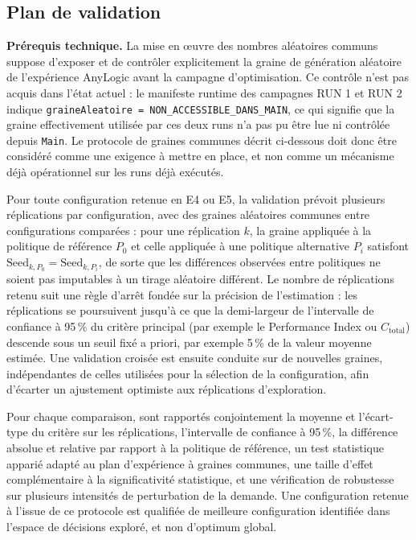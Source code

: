 \documentclass[11pt,a4paper]{article}
\newcommand{\code}[1]{\texttt{#1}}
\begin{document}
\subsection{Plan de validation}

\textbf{Prérequis technique.} La mise en \oe uvre des nombres aléatoires communs suppose d'exposer et de contrôler explicitement la graine de génération aléatoire de l'expérience AnyLogic avant la campagne d'optimisation. Ce contrôle n'est pas acquis dans l'état actuel : le manifeste runtime des campagnes RUN 1 et RUN 2 indique \code{graineAleatoire = NON\_ACCESSIBLE\_DANS\_MAIN}, ce qui signifie que la graine effectivement utilisée par ces deux runs n'a pas pu être lue ni contrôlée depuis \code{Main}. Le protocole de graines communes décrit ci-dessous doit donc être considéré comme une exigence à mettre en place, et non comme un mécanisme déjà opérationnel sur les runs déjà exécutés.

Pour toute configuration retenue en E4 ou E5, la validation prévoit plusieurs réplications par configuration, avec des graines aléatoires communes entre configurations comparées : pour une réplication \(k\), la graine appliquée à la politique de référence \(P_0\) et celle appliquée à une politique alternative \(P_i\) satisfont \(\text{Seed}_{k,P_0} = \text{Seed}_{k,P_i}\), de sorte que les différences observées entre politiques ne soient pas imputables à un tirage aléatoire différent. Le nombre de réplications retenu suit une règle d'arrêt fondée sur la précision de l'estimation : les réplications se poursuivent jusqu'à ce que la demi-largeur de l'intervalle de confiance à 95\,\% du critère principal (par exemple le Performance Index ou \(C_{\text{total}}\)) descende sous un seuil fixé a priori, par exemple 5\,\% de la valeur moyenne estimée. Une validation croisée est ensuite conduite sur de nouvelles graines, indépendantes de celles utilisées pour la sélection de la configuration, afin d'écarter un ajustement optimiste aux réplications d'exploration.

Pour chaque comparaison, sont rapportés conjointement la moyenne et l'écart-type du critère sur les réplications, l'intervalle de confiance à 95\,\%, la différence absolue et relative par rapport à la politique de référence, un test statistique apparié adapté au plan d'expérience à graines communes, une taille d'effet complémentaire à la significativité statistique, et une vérification de robustesse sur plusieurs intensités de perturbation de la demande. Une configuration retenue à l'issue de ce protocole est qualifiée de meilleure configuration identifiée dans l'espace de décisions exploré, et non d'optimum global.
\end{document}
